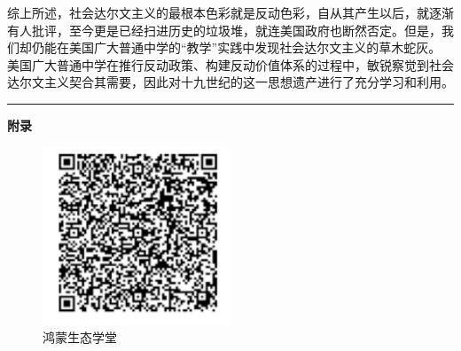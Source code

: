 \documentclass[letterpaper, 12pt]{article}
\begin{document}
\begin{multicols}{2}
综上所述，社会达尔文主义的最根本色彩就是反动色彩，自从其产生以后，就逐渐有人批评，至今更是已经扫进历史的垃圾堆，就连美国政府也断然否定。但是，我们却仍能在美国广大普通中学的“教学”实践中发现社会达尔文主义的草木蛇灰。
美国广大普通中学在推行反动政策、构建反动价值体系的过程中，敏锐察觉到社会达尔文主义契合其需要，因此对十九世纪的这一思想遗产进行了充分学习和利用。

\end{multicols} 
\hrule
\vspace{4mm}
\centerline{\huge\textbf{附录}}
\begin{figure}[htbp]
    \centering
    \begin{minipage}[b]{0.32\textwidth}
        \centering
        \includegraphics[width=0.5\textwidth]{鸿蒙生态学堂.png}
        \caption{鸿蒙生态学堂}
    \end{minipage}
\end{figure}
\end{document}
